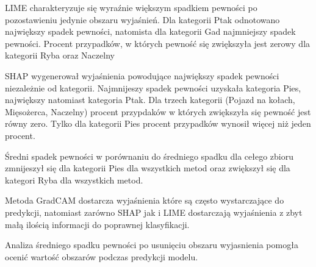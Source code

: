 LIME charakteryzuje się wyraźnie większym spadkiem pewności po pozostawieniu jedynie obszaru wyjaśnień.
Dla kategorii Ptak odnotowano największy spadek pewności, natomista dla kategorii Gad najmniejszy spadek pewności.
Procent przypadków, w których pewność się zwiększyła jest zerowy dla kategorii Ryba oraz Naczelny

SHAP wygenerował wyjaśnienia powodujące największy spadek pewności niezależnie od kategorii.
Najmnijeszy spadek pewności uzyskała kategoria Pies, największy natomiast kategoria Ptak.
Dla trzech kategorii (Pojazd na kołach, Mięsożerca, Naczelny) procent przypdaków w których zwiększyła się pewność jest równy zero.
Tylko dla kategorii Pies procent przypadków wynosił więcej niż jeden procent.

Średni spadek pewności w porównaniu do średniego spadku dla cełego zbioru zmnijeszył się dla kategorii Pies dla wszystkich metod oraz zwiększył się dla kategori Ryba dla wszystkich metod.

Metoda GradCAM dostarcza wyjaśnienia które są często wystarczające do predykcji, natomiast zarówno SHAP jak i LIME dostarczają wyjaśnienia z zbyt małą ilością informacji do poprawnej klasyfikacji.

\vspace{1cm}

Analiza średniego spadku pewności po usunięciu obszaru wyjasnienia pomogła ocenić wartość obszarów podczas predykcji modelu.

